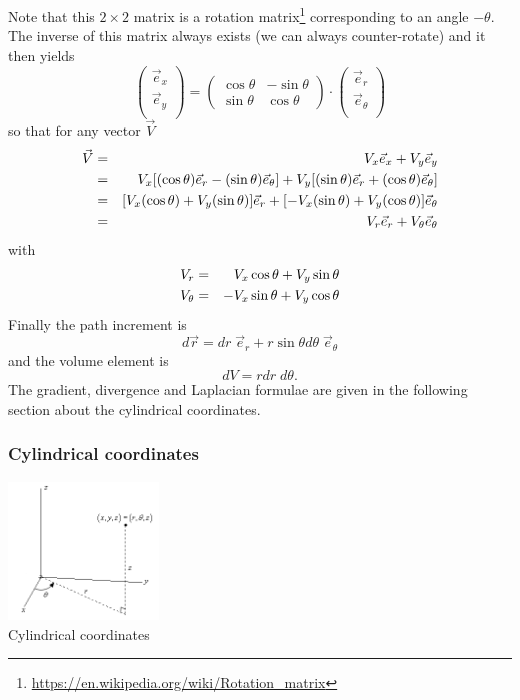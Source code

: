 Note that this $2\times 2$ matrix is a 
rotation matrix\footnote{\url{https://en.wikipedia.org/wiki/Rotation_matrix}}
corresponding to an angle $-\theta$. The inverse of this matrix always exists 
(we can always counter-rotate) and it then yields
\[
\left(
\begin{array}{c}
{\vec e}_{x} \\
{\vec e}_{y} \\
\end{array}
\right)
=
\left(
\begin{array}{cc}
\cos \theta & -\sin \theta \\
\sin \theta & \cos \theta
\end{array}
\right)
\cdot
\left(
\begin{array}{c}
{\vec e}_{r} \\
{\vec e}_{\theta} \\
\end{array}
\right)
\]
so that for any vector ${\vec V}$
\begin{eqnarray}
{\vec V} 
&=& V_x {\vec e}_x  + V_y {\vec e}_y \nonumber\\
&=& V_x [(\cos \theta) {\vec e}_r - (\sin \theta) {\vec e}_\theta]  + 
    V_y [(\sin \theta) {\vec e}_r + (\cos \theta){\vec e}_\theta] \nonumber\\
&=& [V_x (\cos \theta) + V_y (\sin \theta)] {\vec e}_r +
[- V_x(\sin \theta) + V_y (\cos \theta)]{\vec e}_\theta \nonumber\\
&=& V_r \vec{e}_r  + V_\theta \vec{e}_\theta \nonumber
\end{eqnarray}
with
\begin{eqnarray}
V_r &=& V_x \cos \theta + V_y \sin \theta \nonumber\\
V_\theta &=& - V_x \sin \theta + V_y \cos \theta \nonumber
\end{eqnarray}
Finally the path increment is
\[
d\vec{r} = dr \; {\vec e}_r  + r \sin\theta d\theta \; {\vec e}_\theta
\]
and the volume element is 
\[
dV= r dr \; d\theta.
\]
The gradient, divergence and Laplacian formulae are given in the following section about 
the cylindrical coordinates.


\subsubsection{Cylindrical coordinates \label{ss:cylcoord}}

\begin{center}
\includegraphics[width=4cm]{images/cylindrical}\\
{\captionfont Cylindrical coordinates}
\end{center}

